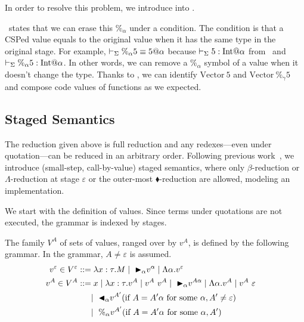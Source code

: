 In order to resolve this problem, we introduce \QPercent{} into \LMD.
\begin{center}
\end{center}
\QPercent\ states that we can erase this $\%_\alpha$ under a condition.
The condition is that a CSPed value equals to the original value when it has the same type in the original stage.
For example, $\vdash_\Sigma \%_\alpha 5 \equiv 5 @ \alpha$ because $ \vdash_\Sigma 5 : \textrm{Int} @ \alpha $ from \TConst\ and  $ \vdash_\Sigma \%_\alpha 5 : \textrm{Int} @ \alpha$.
In other words, we can remove a $\%_\alpha$ symbol of a value when it doesn't change the type.
Thanks to \QPercent, we can identify $\text{Vector}\ 5$ and $\text{Vector}\ \%_\gamma 5$
and compose code values of functions as we expected.

\subsection{Staged Semantics}

The reduction given above is full reduction and any redexes---even
under quotation---can be reduced in an arbitrary order.
Following previous work~\cite{Hanada2014},
we introduce (small-step, call-by-value) staged semantics,
where only $\beta$-reduction or $\Lambda$-reduction at stage $\varepsilon$ or the outer-most $\blacklozenge$-reduction are allowed,
modeling an implementation.

We start with the definition of values. Since terms under quotations are
not executed, the grammar is indexed by stages.

\begin{definition}[Values]
  The family $V^A$ of sets of values, ranged over by $v^A$,
  is defined by the following grammar.  In the grammar, $A \neq \varepsilon$ is assumed.
  \begin{align*}
    v^\varepsilon \in V^\varepsilon & ::= \lambda x:\tau.M \mid\ {\mathop{\blacktriangleright}}_\alpha v^\alpha \mid \Lambda\alpha.v^\varepsilon                                       & \\
    v^A \in V^A                     & ::= x \mid \lambda x:\tau.v^A \mid v^A\ v^A \mid\ {\mathop{\blacktriangleright}}_\alpha v^{A\alpha} \mid \Lambda\alpha.v^A \mid v^A\ \varepsilon & \\
                                    & \quad\   \mid\ {\mathop{\blacktriangleleft}}_\alpha v^{A'} (\text{if } A = A'\alpha \text{ for some } \alpha, A' \neq \varepsilon)             & \\
                                    & \quad\   \mid\ \%_\alpha v^{A'} (\text{if } A = A'\alpha  \text{ for some } \alpha, A')
  \end{align*}
\end{definition}

